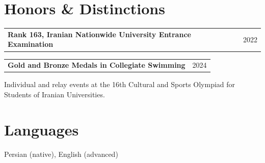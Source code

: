 \documentclass[a4paper,11pt]{article}
\makeatletter
\newcommand{\entry}[2]{%
  \begin{tabularx}{\linewidth}{@{}X@{\hspace{0.8em}}r@{}}%
  \textbf{#1} & {\small #2}\\%
  \end{tabularx}\par}
\makeatother
\begin{document}
\section{Honors \& Distinctions}
\entry{Rank 163, Iranian Nationwide University Entrance Examination}{2022}
\vspace{5pt}
\entry{Gold and Bronze Medals in Collegiate Swimming}{2024}
Individual and relay events at the 16th Cultural and Sports Olympiad for
Students of Iranian Universities.\par

\section{Languages}
Persian (native), English (advanced)

\end{document}
